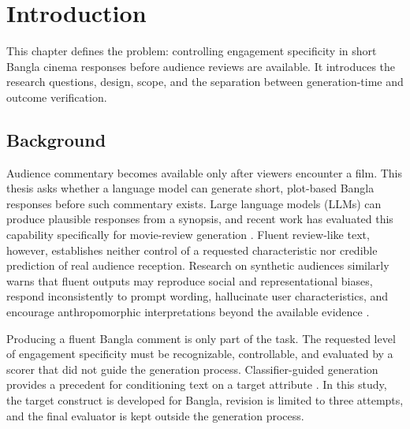 
\chapter{Introduction}
\label{chap:introduction}

\ifpdf
    \graphicspath{{Chapter1/Figs/Raster/}{Chapter1/Figs/PDF/}{Chapter1/Figs/}{Chapter1/figures/}}
\else
    \graphicspath{{Chapter1/Figs/Vector/}{Chapter1/Figs/}{Chapter1/figures/}}
\fi

This chapter defines the problem: controlling engagement specificity in short Bangla cinema responses before audience reviews are available. It introduces the research questions, design, scope, and the separation between generation-time and outcome verification.

\section{Background}

Audience commentary becomes available only after viewers encounter a film. This thesis asks whether a language model can generate short, plot-based Bangla responses before such commentary exists. Large language models (LLMs) can produce plausible responses from a synopsis, and recent work has evaluated this capability specifically for movie-review generation \cite{b12}. Fluent review-like text, however, establishes neither control of a requested characteristic nor credible prediction of real audience reception. Research on synthetic audiences similarly warns that fluent outputs may reproduce social and representational biases, respond inconsistently to prompt wording, hallucinate user characteristics, and encourage anthropomorphic interpretations beyond the available evidence \cite{b1}.

Producing a fluent Bangla comment is only part of the task. The requested level of engagement specificity must be recognizable, controllable, and evaluated by a scorer that did not guide the generation process. Classifier-guided generation provides a precedent for conditioning text on a target attribute \cite{b11}. In this study, the target construct is developed for Bangla, revision is limited to three attempts, and the final evaluator is kept outside the generation process.

